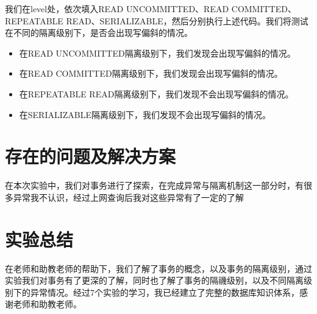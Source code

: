 \documentclass{article}
\begin{document}
我们在{level}处，依次填入READ UNCOMMITTED、READ COMMITTED、REPEATABLE READ、SERIALIZABLE，然后分别执行上述代码。我们将测试在不同的隔离级别下，是否会出现写偏斜的情况。

\begin{itemize}
    \item 在READ UNCOMMITTED隔离级别下，我们发现会出现写偏斜的情况。
    \item 在READ COMMITTED隔离级别下，我们发现会出现写偏斜的情况。
    \item 在REPEATABLE READ隔离级别下，我们发现不会出现写偏斜的情况。
    \item 在SERIALIZABLE隔离级别下，我们发现不会出现写偏斜的情况。
\end{itemize}

\section{存在的问题及解决方案}

在本次实验中，我们对事务进行了探索，在完成异常与隔离机制这一部分时，有很多异常我不认识，经过上网查询后我对这些异常有了一定的了解

\section{实验总结}

在老师和助教老师的帮助下，我们了解了事务的概念，以及事务的隔离级别，通过实验我们对事务有了更深的了解，同时也了解了事务的隔禨级别，以及不同隔离级别下的异常情况。经过7个实验的学习，我已经建立了完整的数据库知识体系，感谢老师和助教老师。
\end{document}
